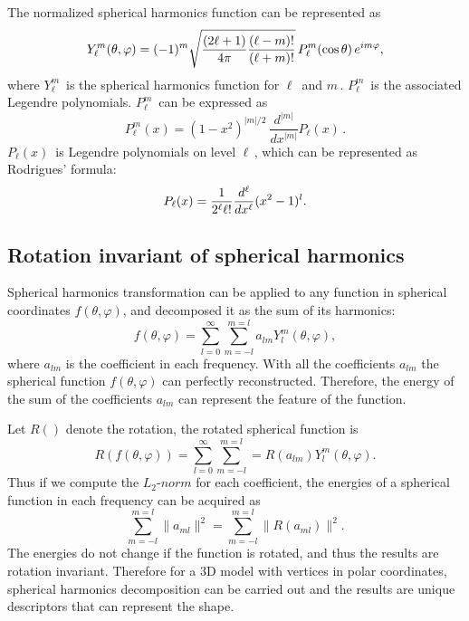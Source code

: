 The normalized spherical harmonics function can be represented as 
\begin{equation} \label{spherical_harmonics}
Y_\ell^m( \theta , \varphi ) = (-1)^m \sqrt{{(2\ell+1)\over 4\pi}{(\ell-m)!\over (\ell+m)!}} \, P_\ell^m ( \cos{\theta} ) \, e^{i m \varphi },
\end{equation}
where $Y_\ell^m\,\!$ is the spherical harmonics function for $\ell\,\!$ and $m\,\!$. $P_\ell^m\,\!$ is the associated Legendre polynomials. $P_\ell^m\,\!$ can be expressed as 
\begin{equation} \label{legendre}
P_\ell^m(x) = (1 - x^2)^{|m|/2}\ \frac{d^{|m|}}{dx^{|m|}}P_\ell(x)\, .
\end{equation}
$P_\ell(x)\,\!$ is Legendre polynomials on level $\ell\,\!$, which can be represented as Rodrigues' formula:
\begin{equation} \label{rodrigues}
P_\ell(x) = {1 \over 2^\ell \ell!} {d^\ell\over dx^\ell }(x^2 - 1)^l.
\end{equation}

\subsection{Rotation invariant of spherical harmonics}

Spherical harmonics transformation can be applied to any function in spherical coordinates $f(\theta,\varphi)$, and decomposed it as the sum of its harmonics:
\begin{equation} \label{sphericalfunction}
f(\theta,\varphi)=\sum_{l=0}^{\infty}\sum_{m=-l}^{m=l}a_{lm}Y_{l}^{m}(\theta,\varphi),
\end{equation}
where $a_{lm}$ is the coefficient in each frequency. With all the coefficients $a_{lm}$ the spherical function $f(\theta,\varphi)$ can perfectly reconstructed. Therefore, the energy of the sum of the coefficients $a_{lm}$ can represent the feature of the function. 

Let $R()$ denote the rotation, the rotated spherical function is
\begin{equation} \label{rotatedfunction}
R(f(\theta,\varphi))=\sum_{l=0}^{\infty}\sum_{m=-l}^{m=l}=R(a_{lm})Y_{l}^{m}(\theta,\varphi).
\end{equation}
Thus if we compute the $L_{2}$-$norm$ for each coefficient, the energies of a spherical function in each frequency can be acquired as
\begin{equation} \label{l2norm}
\sum_{m=-l}^{m=l}\|a_{ml}\|^{2}=\sum_{m=-l}^{m=l}\|R(a_{ml})\|^{2}.
\end{equation}
The energies do not change if the function is rotated, and thus the results are rotation invariant. Therefore for a 3D model with vertices in polar coordinates, spherical harmonics decomposition can be carried out and the results are unique descriptors that can represent the shape. 

